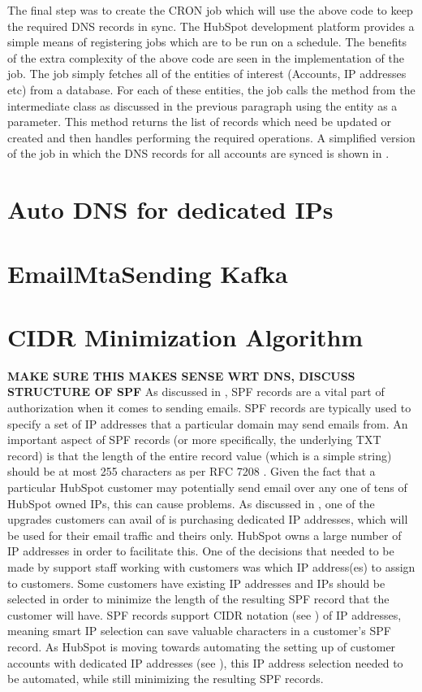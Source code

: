 The final step was to create the CRON job which will use the above code to keep the required DNS records in sync. The HubSpot development platform provides a simple means of registering jobs which are to be run on a schedule. The benefits of the extra complexity of the above code are seen in the implementation of the job. The job simply fetches all of the entities of interest (Accounts, IP addresses etc) from a database. For each of these entities, the job calls the method from the intermediate class as discussed in the previous paragraph using the entity as a parameter. This method returns the list of records which need be updated or created and then handles performing the required operations. A simplified version of the job in which the DNS records for all accounts are synced is shown in  .

\section{Auto DNS for dedicated IPs} \label{sec:autoDns}

\section{EmailMtaSending Kafka}

\section{CIDR Minimization Algorithm}
\textbf{MAKE SURE THIS MAKES SENSE WRT DNS, DISCUSS STRUCTURE OF SPF}\hfill\break
As discussed in , SPF records are a vital part of authorization when it comes to sending emails. SPF records are typically used to specify a set of IP addresses that a particular domain may send emails from. An important aspect of SPF records (or more specifically, the underlying TXT record) is that the length of the entire record value (which is a simple string) should be at most 255 characters as per RFC 7208 \cite{spfRFC}. Given the fact that a particular HubSpot customer may potentially send email over any one of tens of HubSpot owned IPs, this can cause problems. As discussed in , one of the upgrades customers can avail of is purchasing dedicated IP addresses, which will be used for their email traffic and theirs only. HubSpot owns a large number of IP addresses in order to facilitate this. One of the decisions that needed to be made by support staff working with customers was which IP address(es) to assign to customers. Some customers have existing IP addresses and IPs should be selected in order to minimize the length of the resulting SPF record that the customer will have. SPF records support CIDR notation (see ) of IP addresses, meaning smart IP selection can save valuable characters in a customer's SPF record. As HubSpot is moving towards automating the setting up of customer accounts with dedicated IP addresses (see ), this IP address selection needed to be automated, while still minimizing the resulting SPF records.


